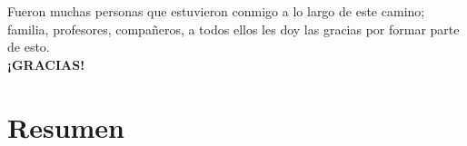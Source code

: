 \documentclass[12pt,titlepage]{article}
\begin{document}



Fueron muchas personas que estuvieron conmigo a lo largo de este camino; familia, profesores, compañeros, a todos ellos les doy las gracias por formar parte de esto. \\

\textbf{¡GRACIAS!}
 
\newpage
\section*{Resumen}
\newpage
{}
\tableofcontents %
\newpage %
\listoffigures %
\newpage
\listoftables %
\newpage
\end{document}
